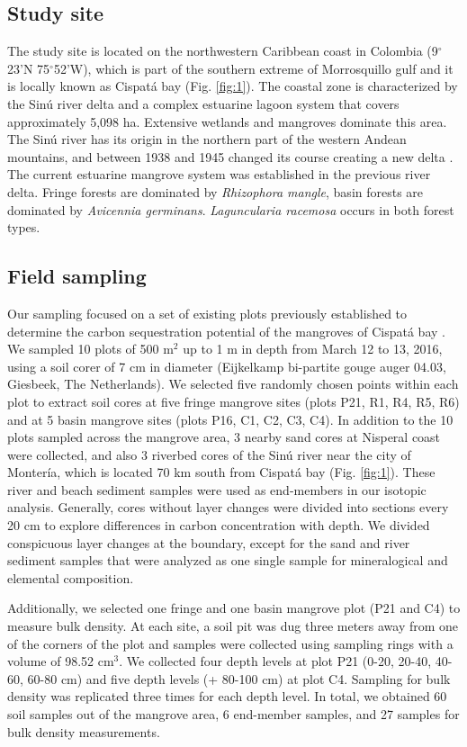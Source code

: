 \subsection{Study site}
The study site is located on the northwestern Caribbean coast in Colombia (9$^{\circ}$23'N 75$^{\circ}$52'W), which is part of the southern extreme of Morrosquillo gulf and it is locally known as Cispat\'a bay (Fig. \ref{fig:1}). The coastal zone is characterized by the Sin\'{u} river delta and a complex estuarine lagoon system that covers approximately 5,098 ha. Extensive wetlands and mangroves dominate this area. The Sin\'{u} river has its origin in the northern part of the western Andean mountains, and between 1938 and 1945 changed its course creating a new delta \citep{suarez2004}. The current estuarine mangrove system was established in the previous river delta. 
Fringe forests are dominated by  \textit{Rhizophora mangle}, basin forests are dominated by \textit{Avicennia germinans}. \textit{Laguncularia racemosa} occurs in both forest types.


\subsection{Field sampling}
Our sampling focused on a set of existing plots previously established to determine the carbon sequestration potential of the mangroves of Cispat\'a bay \citep{Bolivar2015}. We sampled 10 plots of 500 m$^2$ up to 1 m in depth from March 12 to 13, 2016, using a soil corer of 7 cm in diameter (Eijkelkamp bi-partite gouge auger 04.03, Giesbeek, The Netherlands). We selected five randomly chosen points within each plot to extract soil cores at five fringe mangrove sites (plots P21, R1, R4, R5, R6) and at 5  basin mangrove sites (plots P16, C1, C2, C3, C4). In addition to the 10 plots sampled across the mangrove area, 3 nearby sand cores at Nisperal coast were collected, and also 3 riverbed cores of the Sin\'{u} river near the city of Monter\'{i}a, which is located 70 km south from Cispat\'{a} bay (Fig. \ref{fig:1}). These river and beach sediment samples were used as end-members in our isotopic analysis. Generally, cores without layer changes were divided into sections every 20 cm to explore differences in carbon concentration with depth. We divided conspicuous layer changes at the boundary, except for the sand and river sediment samples that were analyzed as one single sample for mineralogical and elemental composition. 

Additionally, we selected one fringe and one basin mangrove plot (P21 and C4) to measure bulk density. At each site, a soil pit was dug three meters away from one of the corners of the plot and samples were collected using sampling rings with a volume of 98.52 cm$^3$. We collected four depth levels at plot P21 (0-20, 20-40, 40-60, 60-80 cm) and five depth levels (+ 80-100 cm) at plot C4. Sampling for bulk density was replicated three times for each depth level. In total, we obtained 60 soil samples out of the mangrove area, 6 end-member samples, and 27 samples for bulk density measurements.
\label{sec:2}


